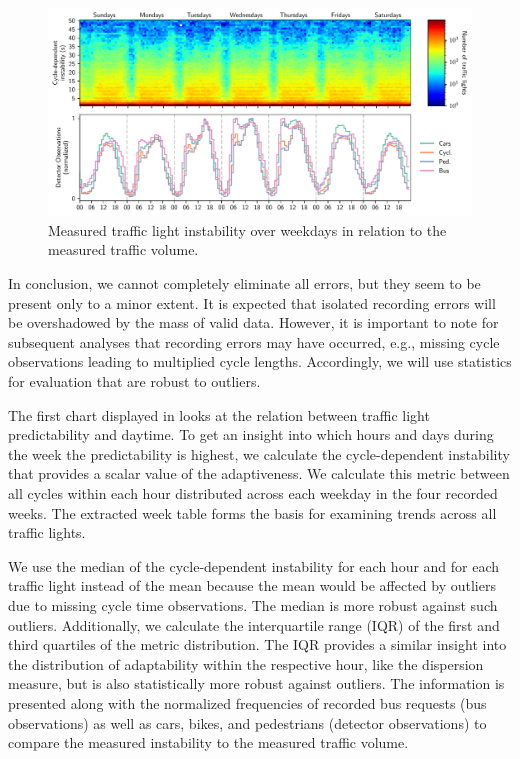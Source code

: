 \begin{figure}[th]
    \centering
    \includegraphics[width=\linewidth]{images/predictability-week-heatmap.pdf}
    \caption{Measured traffic light instability over weekdays in relation to the measured traffic volume.}\label{fig:adaptiveness-weekdays-distance}
\end{figure}

In conclusion, we cannot completely eliminate all errors, but they seem to be present only to a minor extent. It is expected that isolated recording errors will be overshadowed by the mass of valid data. However, it is important to note for subsequent analyses that recording errors may have occurred, e.g., missing cycle observations leading to multiplied cycle lengths. Accordingly, we will use statistics for evaluation that are robust to outliers.

The first chart displayed in  looks at the relation between traffic light predictability and daytime. To get an insight into which hours and days during the week the predictability is highest, we calculate the cycle-dependent instability that provides a scalar value of the adaptiveness. We calculate this metric between all cycles within each hour distributed across each weekday in the four recorded weeks. The extracted week table forms the basis for examining trends across all traffic lights.

We use the median of the cycle-dependent instability for each hour and for each traffic light instead of the mean because the mean would be affected by outliers due to missing cycle time observations. The median is more robust against such outliers. Additionally, we calculate the interquartile range (IQR) of the first and third quartiles of the metric distribution. The IQR provides a similar insight into the distribution of adaptability within the respective hour, like the dispersion measure, but is also statistically more robust against outliers. The information is presented along with the normalized frequencies of recorded bus requests (bus observations) as well as cars, bikes, and pedestrians (detector observations) to compare the measured instability to the measured traffic volume.

